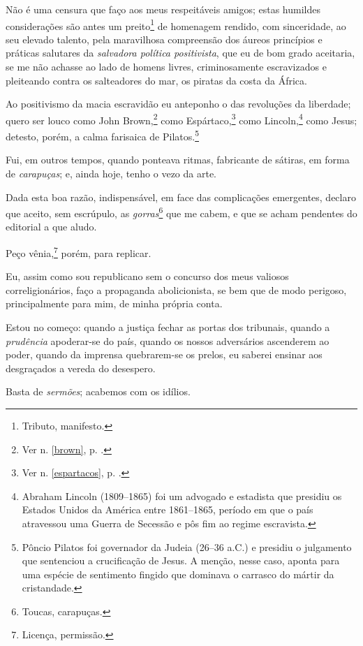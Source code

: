 Não é uma censura que faço aos meus respeitáveis amigos; estas humildes
considerações são antes um preito\footnote{Tributo, manifesto.} de
homenagem rendido, com sinceridade, ao seu elevado talento, pela
maravilhosa compreensão dos áureos princípios e práticas salutares da
\emph{salvadora política positivista}, que eu de bom grado aceitaria, se
me não achasse ao lado de homens livres, criminosamente escravizados e
pleiteando contra os salteadores do mar, os piratas da costa da África.

Ao positivismo da macia escravidão eu anteponho o das revoluções da
liberdade; quero ser louco como John
Brown,\footnote{Ver n. \ref{brown}, p. \pageref{brown}.} como
Espártaco,\footnote{Ver n. \ref{espartacos}, p. \pageref{espartacos}.} como Lincoln,\footnote{Abraham Lincoln (1809--1865) foi
  um advogado e estadista que presidiu os Estados Unidos da América
  entre 1861--1865, período em que o país atravessou uma Guerra de
  Secessão e pôs fim ao regime escravista.} como Jesus; detesto, porém,
a calma farisaica de Pilatos.\footnote{Pôncio Pilatos foi governador
  da Judeia (26--36 a.C.) e presidiu o julgamento que sentenciou a
  crucificação de Jesus. A menção, nesse caso, aponta para uma espécie
  de sentimento fingido que dominava o carrasco do mártir da
  cristandade.}

Fui, em outros tempos, quando ponteava ritmas, fabricante de sátiras, em
forma de \emph{carapuças}; e, ainda hoje, tenho o vezo da arte.

Dada esta boa razão, indispensável, em face das complicações emergentes,
declaro que aceito, sem escrúpulo, as \emph{gorras}\footnote{Toucas,
  carapuças.} que me cabem, e que se acham pendentes do editorial a que
aludo.

Peço vênia,\footnote{Licença, permissão.} porém, para replicar.

Eu, assim como sou republicano sem o concurso dos meus valiosos
correligionários, faço a propaganda abolicionista, se bem que de modo
perigoso, principalmente para mim, de minha própria conta.

Estou no começo: quando a justiça fechar as portas dos tribunais, quando
a \emph{prudência} apoderar-se do país, quando os nossos adversários
ascenderem ao poder, quando da imprensa quebrarem-se os prelos, eu
saberei ensinar aos desgraçados a vereda do desespero.

Basta de \emph{sermões}; acabemos com os idílios.


